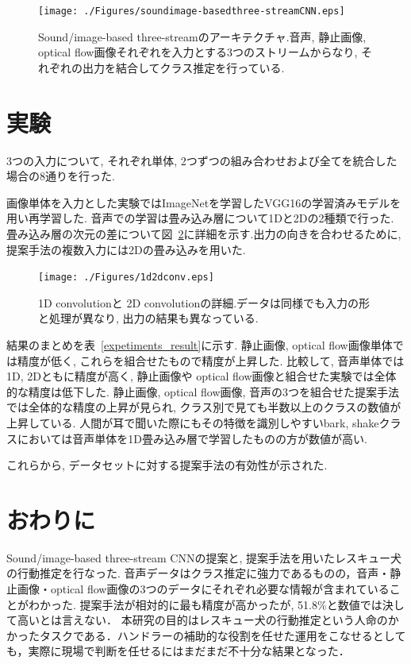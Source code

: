 \documentclass[twocolumn, a4paper]{UECIEresume}
\begin{document}
\begin{figure}[htbp]
   \begin{center}
    \texttt{[image: ./Figures/soundimage-basedthree-streamCNN.eps]}
    \caption{Sound/image-based three-streamのアーキテクチャ.音声, 静止画像, optical flow画像それぞれを入力とする3つのストリームからなり, それぞれの出力を結合してクラス推定を行っている.}
    \label{sound3st}
   \end{center}
\end{figure}


\section{実験}
3つの入力について, それぞれ単体, 2つずつの組み合わせおよび全てを統合した場合の8通りを行った.

画像単体を入力とした実験ではImageNetを学習したVGG16の学習済みモデルを用い再学習した.
音声での学習は畳み込み層について1Dと2Dの2種類で行った.
畳み込み層の次元の差について図~\ref{1d2dconv}に詳細を示す.出力の向きを合わせるために, 提案手法の複数入力には2Dの畳み込みを用いた.
\begin{figure}[htbp]
   \begin{center}
    \texttt{[image: ./Figures/1d2dconv.eps]}
    \caption{1D convolutionと 2D convolutionの詳細.データは同様でも入力の形と処理が異なり, 出力の結果も異なっている.}
    \label{1d2dconv}
   \end{center}
\end{figure}


結果のまとめを表~\ref{expetiments_result}に示す.
静止画像, optical flow画像単体では精度が低く, これらを組合せたもので精度が上昇した.
比較して, 音声単体では1D, 2Dともに精度が高く, 静止画像や optical flow画像と組合せた実験では全体的な精度は低下した.
静止画像, optical flow画像, 音声の3つを組合せた提案手法では全体的な精度の上昇が見られ, クラス別で見ても半数以上のクラスの数値が上昇している.
人間が耳で聞いた際にもその特徴を識別しやすいbark, shakeクラスにおいては音声単体を1D畳み込み層で学習したものの方が数値が高い.

これらから, データセットに対する提案手法の有効性が示された.


\section{おわりに}
Sound/image-based three-stream CNNの提案と, 提案手法を用いたレスキュー犬の行動推定を行なった.
音声データはクラス推定に強力であるものの，音声・静止画像・optical flow画像の3つのデータにそれぞれ必要な情報が含まれていることがわかった.
提案手法が相対的に最も精度が高かったが, 51.8\%と数値では決して高いとは言えない．
本研究の目的はレスキュー犬の行動推定という人命のかかったタスクである．ハンドラーの補助的な役割を任せた運用をこなせるとしても，実際に現場で判断を任せるにはまだまだ不十分な結果となった．
\end{document}
